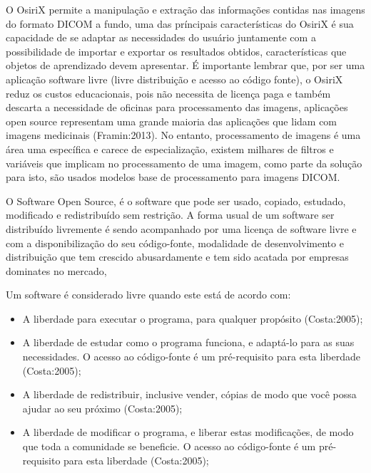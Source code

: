 \documentclass[12pt,openright,oneside,a4paper,english,french,spanish,brazil]{unifil}
\begin{document}
O OsiriX permite a manipulação e extração das informações contidas nas imagens do formato DICOM a fundo, uma das príncipais características do OsiriX é sua capacidade de se adaptar as necessidades do usuário juntamente com a possibilidade de importar e exportar os resultados obtidos, características que objetos de aprendizado devem apresentar. É importante lembrar que, por ser uma aplicação software livre (livre distribuição e acesso ao código fonte), o OsiriX reduz os custos educacionais, pois não necessita de licença paga e também descarta a necessidade de oficinas para processamento das imagens, aplicações open source representam uma grande maioria das aplicações que lidam com imagens medicinais (Framin:2013). No entanto, processamento de imagens é uma área uma específica e carece de especialização, existem milhares de filtros e variáveis que implicam no processamento de uma imagem, como parte da solução para isto, são usados modelos base de processamento para imagens DICOM.

O Software Open Source, é o software que pode ser usado, copiado, estudado, modificado e redistribuído sem restrição. A forma usual de um software ser distribuído livremente é sendo acompanhado por uma licença de software livre e com a disponibilização do seu código-fonte, modalidade de desenvolvimento e distribuição que tem crescido abusardamente e tem sido acatada por empresas dominates no mercado,

Um software é considerado livre quando este está de acordo com:
\begin{itemize}
\item A liberdade para executar o programa, para qualquer propósito (Costa:2005);
\item A liberdade de estudar como o programa funciona, e adaptá-lo para as suas necessidades. O acesso ao código-fonte é um pré-requisito para esta liberdade (Costa:2005);
\item A liberdade de redistribuir, inclusive vender, cópias de modo que você possa ajudar ao seu próximo (Costa:2005);
\item A liberdade de modificar o programa, e liberar estas modificações, de modo que toda a comunidade se beneficie. O acesso ao código-fonte é um pré-requisito para esta liberdade (Costa:2005); 
\end{itemize}
\end{document}
